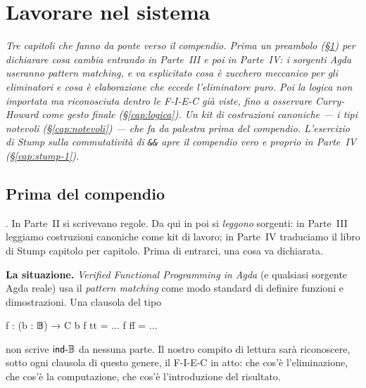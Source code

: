 \part{Lavorare nel sistema}

\noindent\itshape Tre capitoli che fanno da ponte verso il compendio.
Prima un preambolo (\S\ref{cap:prima}) per dichiarare cosa cambia
entrando in Parte~III e poi in Parte~IV: i sorgenti Agda useranno
pattern matching, e va esplicitato cosa \`e zucchero meccanico per gli
eliminatori e cosa \`e elaborazione che eccede l'eliminatore puro. Poi
la logica non importata ma riconosciuta dentro le F-I-E-C gi\`a viste,
fino a osservare Curry-Howard come gesto finale (\S\ref{cap:logica}).
Un kit di costruzioni canoniche --- i \emph{tipi notevoli}
(\S\ref{cap:notevoli}) --- che fa da palestra prima del compendio.
L'esercizio di Stump sulla commutativit\`a di \texttt{\&\&} apre il
compendio vero e proprio in Parte~IV (\S\ref{cap:stump-1}).\upshape

\bigskip

\chapter{Prima del compendio}\label{cap:prima}

. In Parte~II si scrivevano regole. Da qui in poi si \emph{leggono} sorgenti: in Parte~III leggiamo costruzioni canoniche come kit di lavoro; in Parte~IV traduciamo il libro di Stump capitolo per capitolo. Prima di entrarci, una cosa va dichiarata.

\bigskip

\noindent\textbf{La situazione.} \emph{Verified Functional Programming in Agda} (e qualsiasi sorgente Agda reale) usa il \emph{pattern matching} come modo standard di definire funzioni e dimostrazioni. Una clausola del tipo

\begin{agda}
f : (b : 𝔹) → C b
f tt = ...
f ff = ...
\end{agda}

non scrive $\mathsf{ind\text{-}\mathbb{B}}$ da nessuna parte. Il nostro compito di lettura sar\`a riconoscere, sotto ogni clausola di questo genere, il F-I-E-C in atto: che cos'\`e l'eliminazione, che cos'\`e la computazione, che cos'\`e l'introduzione del risultato.


